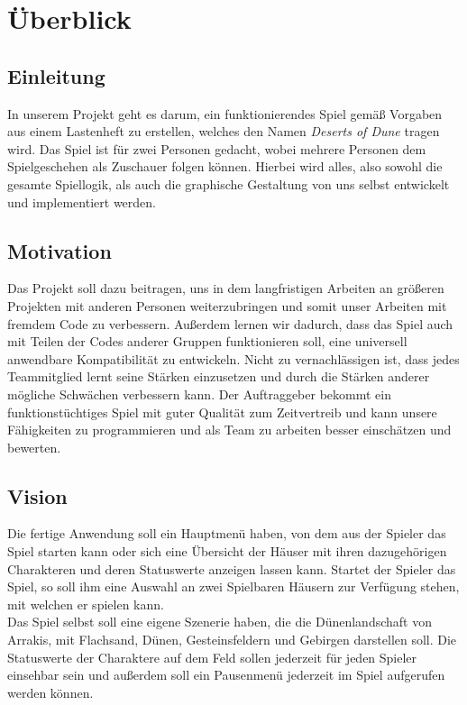 \documentclass[12pt]{article}
\begin{document}
\tableofcontents

\newpage

\section{Überblick}

\subsection{Einleitung}

In unserem Projekt geht es darum, ein funktionierendes Spiel gemäß Vorgaben aus einem Lastenheft zu erstellen, welches den Namen \textit{Deserts of Dune} tragen wird. Das Spiel ist für zwei Personen gedacht, wobei mehrere Personen dem Spielgeschehen als Zuschauer folgen können. Hierbei wird alles, also sowohl die gesamte Spiellogik, als auch die graphische Gestaltung von uns selbst entwickelt und implementiert werden.

\subsection{Motivation}

Das Projekt soll dazu beitragen, uns in dem langfristigen Arbeiten an größeren Projekten mit anderen Personen weiterzubringen und somit unser Arbeiten mit fremdem Code zu verbessern. Außerdem lernen wir dadurch, dass das Spiel auch mit Teilen der Codes anderer Gruppen funktionieren soll, eine universell anwendbare Kompatibilität zu entwickeln. Nicht zu vernachlässigen ist, dass jedes Teammitglied lernt seine Stärken einzusetzen und durch die Stärken anderer mögliche Schwächen verbessern kann.
Der Auftraggeber bekommt ein funktionstüchtiges Spiel mit guter Qualität zum Zeitvertreib und kann unsere Fähigkeiten zu programmieren und als Team zu arbeiten besser einschätzen und bewerten.

\subsection{Vision}

Die fertige Anwendung soll ein Hauptmenü haben, von dem aus der Spieler das Spiel starten kann oder sich eine Übersicht der Häuser mit ihren dazugehörigen Charakteren und deren Statuswerte anzeigen lassen kann. 
Startet der Spieler das Spiel, so soll ihm eine Auswahl an zwei Spielbaren Häusern zur Verfügung stehen, mit welchen er spielen kann. \\
Das Spiel selbst soll eine eigene Szenerie haben, die die Dünenlandschaft von Arrakis, mit Flachsand, Dünen, Gesteinsfeldern und Gebirgen darstellen soll. Die Statuswerte der Charaktere auf dem Feld sollen jederzeit für jeden Spieler einsehbar sein und außerdem soll ein Pausenmenü jederzeit im Spiel aufgerufen werden können.
\end{document}
